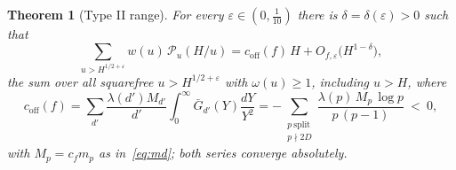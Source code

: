\documentclass[11pt,a4paper]{article}
\newtheorem{theorem}{Theorem}
\theoremstyle{remark}\newtheorem{remark}[theorem]{Remark}
\begin{document}
\begin{theorem}[Type II range]\label{thm:typeII}
For every $\varepsilon\in(0,\tfrac1{10})$ there is $\delta=\delta(\varepsilon)>0$ such that
\[
\sum_{u>H^{1/2+\varepsilon}}w(u)\,\mathcal P_u(H/u)=c_{\mathrm{off}}(f)\,H+O_{f,\varepsilon}\bigl(H^{1-\delta}\bigr),
\]
the sum over all squarefree $u>H^{1/2+\varepsilon}$ with $\omega(u)\ge1$, including $u>H$, where
\begin{equation}\label{eq:coff}
c_{\mathrm{off}}(f)=\sum_{d'}\frac{\lambda(d')M_{d'}}{d'}\int_0^\infty\bar G_{d'}(Y)\frac{dY}{Y^2}
=-\sum_{\substack{p\ \mathrm{split}\\ p\nmid2D}}\frac{\lambda(p)\,M_p\,\log p}{p\,(p-1)}\ <\ 0,
\end{equation}
with $M_p=c_fm_p$ as in~\eqref{eq:md}; both series converge absolutely.
\end{theorem}
\end{document}
